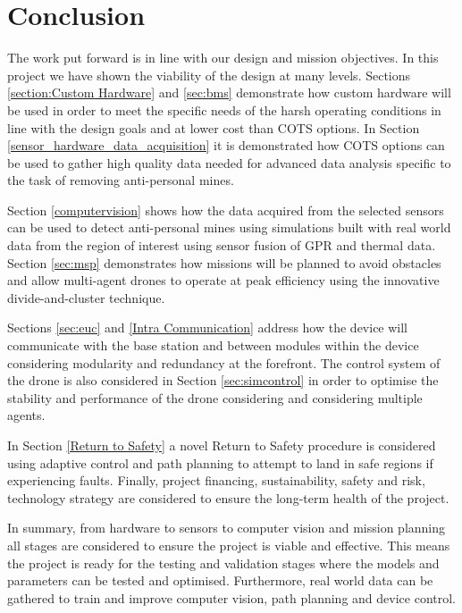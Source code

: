 \newpage
{}

\section{Conclusion} \label{conclusion}

The work put forward is in line with our design and mission objectives. In this project we have shown the viability of the design at many levels. Sections \ref{section:Custom Hardware} and \ref{sec:bms} demonstrate how custom hardware will be used in order to meet the specific needs of the harsh operating conditions in line with the design goals and at lower cost than \gls{COTS} options. In Section \ref{sensor_hardware_data_acquisition} it is demonstrated how \gls{COTS} options can be used to gather high quality data needed for advanced data analysis specific to the task of removing anti-personal mines.

Section \ref{computervision} shows how the data acquired from the selected sensors can be used to detect anti-personal mines using simulations built with real world data from the region of interest using sensor fusion of \gls{GPR} and thermal data. Section \ref{sec:msp} demonstrates how missions will be planned to avoid obstacles and allow multi-agent drones to operate at peak efficiency using the innovative divide-and-cluster technique. 

Sections \ref{sec:euc} and \ref{Intra Communication} address how the device will communicate with the base station and between modules within the device considering modularity and redundancy at the forefront. The control system of the drone is also considered in Section \ref{sec:simcontrol} in order to optimise the stability and performance of the drone considering and considering multiple agents. 

In Section \ref{Return to Safety} a novel Return to Safety procedure is considered using adaptive control and path planning to attempt to land in safe regions if experiencing faults. Finally, project financing, sustainability, safety and risk, technology strategy are considered to ensure the long-term health of the project. 

In summary, from hardware to sensors to computer vision and mission planning all stages are considered to ensure the project is viable and effective. This means the project is ready for the testing and validation stages where the models and parameters can be tested and optimised. Furthermore, real world data can be gathered to train and improve computer vision, path planning and device control.